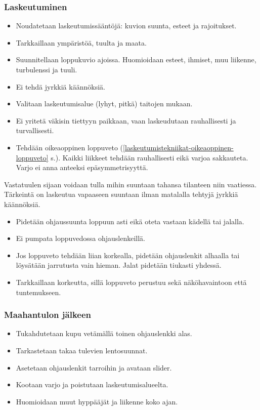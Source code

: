 \subsubsection{ Laskeutuminen }
\label{kuvunkasittely-oppilaana-laskeutuminen}

\begin{itemize}
\item  Noudatetaan laskeutumissääntöjä: kuvion suunta, esteet ja rajoitukset. 
\item  Tarkkaillaan ympäristöä, tuulta ja maata. 
\item  Suunnitellaan loppukuvio ajoissa. Huomioidaan esteet, ihmiset, muu liikenne, turbulenssi ja tuuli. 
\item  Ei tehdä jyrkkiä käännöksiä. 
\item  Valitaan laskeutumisalue (lyhyt, pitkä) taitojen mukaan. 
\item  Ei yritetä väkisin tiettyyn paikkaan, vaan laskeudutaan rauhallisesti ja turvallisesti.  
\item  Tehdään oikeaoppinen loppuveto (\ref{laskeutumistekniikat-oikeaoppinen-loppuveto} s.\pageref{laskeutumistekniikat-oikeaoppinen-loppuveto}). Kaikki liikkeet tehdään rauhallisesti eikä varjoa sakkauteta. Varjo ei anna anteeksi epäsymmetrisyyttä. 
\end{itemize}

Vastatuulen sijaan voidaan tulla mihin suuntaan tahansa tilanteen niin vaatiessa. Tärkeintä on laskeutua vapaaseen suuntaan ilman matalalla tehtyjä jyrkkiä käännöksiä. 

\begin{itemize}
\item  Pidetään ohjaussuunta loppuun asti eikä oteta vastaan kädellä tai jalalla. 
\item  Ei pumpata loppuvedossa ohjauslenkeillä. 
\item  Jos loppuveto tehdään liian korkealla, pidetään ohjauslenkit alhaalla tai löysätään jarrutusta vain hieman. Jalat pidetään tiukasti yhdessä. 
\item  Tarkkaillaan korkeutta, sillä loppuveto perustuu sekä näköhavaintoon että tuntemukseen. 
\end{itemize}
\subsubsection{ Maahantulon jälkeen }
\label{kuvunkasittely-oppilaana-maahantulon-jalkeen}

\begin{itemize}
\item  Tukahdutetaan kupu vetämällä toinen ohjauslenkki alas. 
\item  Tarkastetaan takaa tulevien lentosuunnat. 
\item  Asetetaan ohjauslenkit tarroihin ja avataan slider. 
\item  Kootaan varjo ja poistutaan laskeutumisalueelta. 
\item  Huomioidaan muut hyppääjät ja liikenne koko ajan. 
\end{itemize}

